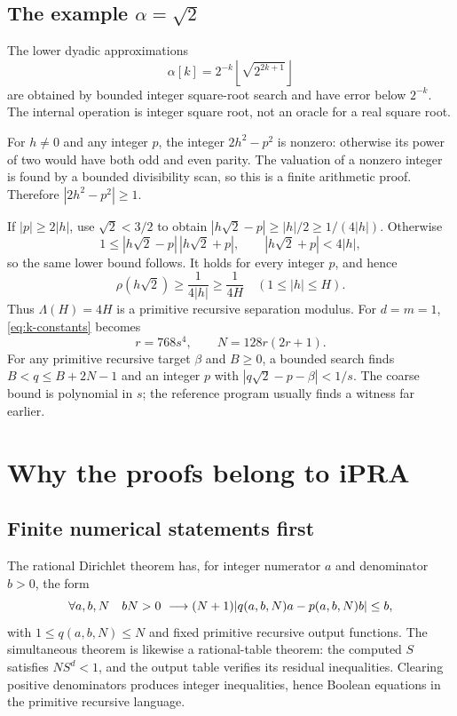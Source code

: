\documentclass[11pt]{article}
\theoremstyle{definition}\newtheorem{definition}[theorem]{Definition}
\theoremstyle{remark}\newtheorem{remark}[theorem]{Remark}
\newcommand{\floor}[1]{\left\lfloor#1\right\rfloor}
\begin{document}
\subsection{The example \texorpdfstring{$\alpha=\sqrt2$}{alpha = square root of 2}}

The lower dyadic approximations
\[
 \alpha[k]=2^{-k}\floor{\sqrt{2^{2k+1}}}
\]
are obtained by bounded integer square-root search and have error below $2^{-k}$. The internal operation is integer square root, not an oracle for a real square root.

For $h\ne0$ and any integer $p$, the integer $2h^2-p^2$ is nonzero: otherwise its power of two would have both odd and even parity. The valuation of a nonzero integer is found by a bounded divisibility scan, so this is a finite arithmetic proof. Therefore $|2h^2-p^2|\ge1$.

If $|p|\ge2|h|$, use $\sqrt2<3/2$ to obtain $|h\sqrt2-p|\ge|h|/2\ge1/(4|h|)$. Otherwise
\[
 1\le |h\sqrt2-p|\,|h\sqrt2+p|,
 \qquad |h\sqrt2+p|<4|h|,
\]
so the same lower bound follows. It holds for every integer $p$, and hence
\[
 \rho(h\sqrt2)\ge\frac1{4|h|}\ge\frac1{4H}
 \quad(1\le|h|\le H).
\]
Thus $\Lambda(H)=4H$ is a primitive recursive separation modulus. For $d=m=1$, \eqref{eq:k-constants} becomes
\[
 r=768s^4,\qquad N=128r(2r+1).
\]
For any primitive recursive target $\beta$ and $B\ge0$, a bounded search finds $B<q\le B+2N-1$ and an integer $p$ with $|q\sqrt2-p-\beta|<1/s$. The coarse bound is polynomial in $s$; the reference program usually finds a witness far earlier.

\section{Why the proofs belong to iPRA}\label{sec:internalization}

\subsection{Finite numerical statements first}

The rational Dirichlet theorem has, for integer numerator $a$ and denominator $b>0$, the form
\[
 \forall a,b,N\quad bN>0\ \longrightarrow\\
 (N+1)|q(a,b,N)a-p(a,b,N)b|\le b,
\]
with $1\le q(a,b,N)\le N$ and fixed primitive recursive output functions. The simultaneous theorem is likewise a rational-table theorem: the computed $S$ satisfies $NS^d<1$, and the output table verifies its residual inequalities. Clearing positive denominators produces integer inequalities, hence Boolean equations in the primitive recursive language.
\end{document}
